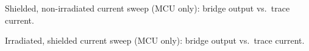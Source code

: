 \documentclass[12pt,a4paper]{article}
\begin{document}
\begin{table}[H]
    \centering
    
    \begin{minipage}[t]{0.48\textwidth}
        \caption{Shielded, non-irradiated current sweep (MCU only): bridge output vs.\ trace current.}
        \label{tab:sensitivity-shielded}
    \end{minipage}\hfill
    \begin{minipage}[t]{0.48\textwidth}
        \caption{Irradiated, shielded current sweep (MCU only): bridge output vs.\ trace current.}
        \label{tab:sensitivity-irr-shielded}
    \end{minipage}
    
    \vspace{0.3cm} %
    

\end{table}
\end{document}
